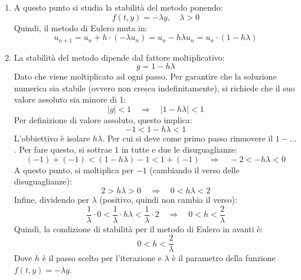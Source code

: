 \begin{itemize}
\begin{enumerate}
        \item A questo punto si studia la stabilità del metodo ponendo:
        \begin{equation*}
            f(t, y) = -\lambda y, \quad \lambda > 0
        \end{equation*}
        Quindi, il metodo di Eulero muta in:
        \begin{equation*}
            u_{n+1} = u_{n} + h \cdot \left(-\lambda u_{n}\right) = u_{n} - h\lambda u_{n} = u_{n} \cdot \left(1 - h\lambda\right)
        \end{equation*}

        \item La stabilità del metodo dipende dal fattore moltiplicativo:
        \begin{equation*}
            g = 1 - h\lambda
        \end{equation*}
        Dato che viene moltiplicato ad ogni passo. Per garantire che la soluzione numerica sia stabile (ovvero non cresca indefinitamente), si richiede che il suo valore assoluto sia minore di 1:
        \begin{equation*}
            |g| < 1 \quad \Rightarrow \quad |1 - h\lambda| < 1
        \end{equation*}
        Per definizione di valore assoluto, questo implica:
        \begin{equation*}
            -1 < 1 - h\lambda < 1
        \end{equation*}
        L'obbiettivo è isolare $h \lambda$. Per cui si deve come primo passo rimuovere il $1 - \dots$. Per fare questo, si sottrae $1$ in tutte e due le disuguaglianze:
        \begin{equation*}
            \left(-1\right) + \left(-1\right) < \left(1 - h\lambda\right) - 1 < 1 + \left(- 1\right) \quad \Rightarrow \quad -2 < - h\lambda < 0
        \end{equation*}
        A questo punto, si moltiplica per $-1$ (cambiando il verso delle disuguaglianze):
        \begin{equation*}
            2 > h\lambda > 0 \quad \Rightarrow \quad 0 < h\lambda < 2
        \end{equation*}
        Infine, dividendo per $\lambda$ (positivo, quindi non cambia il verso):
        \begin{equation*}
            \dfrac{1}{\lambda} \cdot 0 < \dfrac{1}{\lambda} \cdot h\lambda < \dfrac{1}{\lambda} \cdot 2 \quad \Rightarrow \quad 0 < h < \dfrac{2}{\lambda}
        \end{equation*}
        Quindi, la condizione di stabilità per il metodo di Eulero in avanti è:
        \begin{equation*}
            0 < h < \dfrac{2}{\lambda}
        \end{equation*}
        Dove $h$ è il passo scelto per l'iterazione e $\lambda$ è il parametro della funzione $f(t, y) = -\lambda y$.
    \end{enumerate}
\end{itemize}